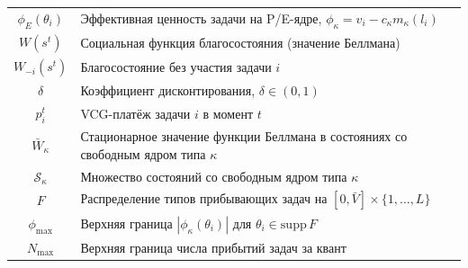 \documentclass[14pt, oneside]{extbook}
\begin{document}
\begin{center}
\begin{longtable}{|c|p{11cm}|}
              $\phi_E(\theta_i)$ & Эффективная
              ценность задачи на P/E-ядре,
              $\phi_\kappa = v_i - c_\kappa m_\kappa(l_i)$ \\
        $W(s^t)$ & Социальная функция
              благосостояния (значение Беллмана) \\
        $W_{-i}(s^t)$ & Благосостояние без участия
              задачи $i$ \\
        $\delta$ & Коэффициент дисконтирования,
              $\delta \in (0, 1)$ \\
        $p_i^t$ & VCG-платёж задачи $i$ в момент
              $t$ \\
        $\bar{W}_\kappa$ & Стационарное значение
              функции Беллмана в состояниях со
              свободным ядром типа $\kappa$ \\
        $\mathcal{S}_\kappa$ & Множество состояний со
              свободным ядром типа $\kappa$ \\
        $F$ & Распределение типов прибывающих задач
              на $[0, \bar V] \times \{1, \ldots, L\}$ \\
        $\phi_{\max}$ & Верхняя граница $|\phi_\kappa(\theta_i)|$
              для $\theta_i \in \mathrm{supp}\,F$ \\
        $N_{\max}$ & Верхняя граница числа прибытий
              задач за квант \\
        \hline
\end{longtable}
\end{center}
\end{document}
